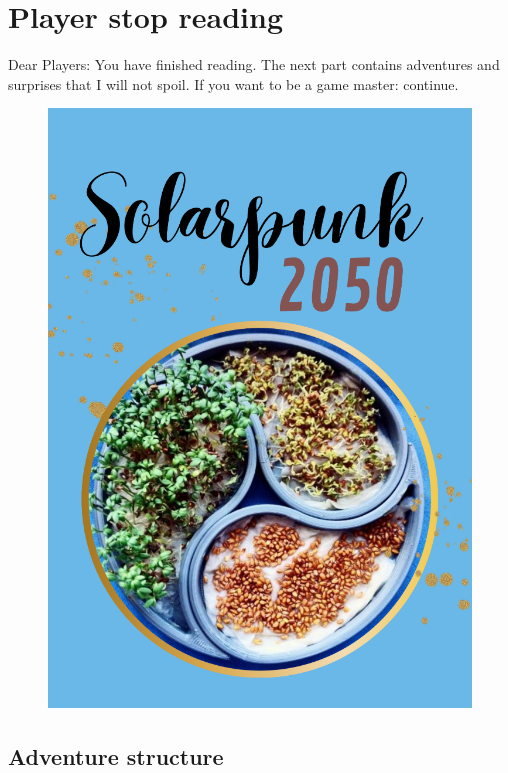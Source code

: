 \chapter{Player stop reading}

Dear Players: You have finished reading. The next part contains adventures and surprises that I will not spoil. If you want to be a game master: continue.


\begin{figure}[!h]
    \includegraphics[width=\linewidth]{static/title.png}
  \end{figure}

\section{Adventure structure}

